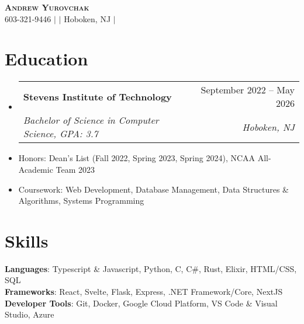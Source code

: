 \documentclass[letterpaper,11pt]{article}
\makeatletter
\newcommand{\resumeItem}[1]{
  \item\small{
    {#1 \vspace{-2pt}}
  }
}
\newcommand{\resumeSubheading}[4]{
  \vspace{-2pt}\item
    \begin{tabular*}{0.97\textwidth}[t]{l@{\extracolsep{\fill}}r}
      \textbf{#1} & #2 \\
      \textit{\small#3} & \textit{\small #4} \\
    \end{tabular*}\vspace{-7pt}
}
\newcommand{\resumeSubItem}[1]{\resumeItem{#1}\vspace{-4pt}}
\newcommand{\resumeSubHeadingListStart}{\begin{itemize}[leftmargin=0.15in, label={}]}
\newcommand{\resumeSubHeadingListEnd}{\end{itemize}}
\makeatother
\begin{document}

\begin{center}
    \textbf{\Huge \scshape Andrew Yurovchak} \\ \vspace{3pt}
    \small 603-321-9446 $|$ \href{mailto:andy@yurovchak.net}{\underline{}} $|$ \small{Hoboken, NJ} $|$
    \href{https://portfolio.baetylboy.biz}{\underline{}} \\ \vspace{-3pt}
\end{center}


\section{Education}
  \resumeSubHeadingListStart
    \resumeSubheading
      {Stevens Institute of Technology}{September 2022 -- May 2026}
      {Bachelor of Science in Computer Science, GPA: 3.7}{Hoboken, NJ}
    \resumeSubItem{Honors: Dean's List (Fall 2022, Spring 2023, Spring 2024), NCAA All-Academic Team 2023}
    \resumeSubItem{Coursework: Web Development, Database Management, Data Structures \& Algorithms, Systems Programming}
  \resumeSubHeadingListEnd


\section{Skills}
 \begin{itemize}[leftmargin=0.15in, label={}]
    \small{\item{
     \textbf{Languages}{: Typescript \& Javascript, Python, C, C\#, Rust, Elixir, HTML/CSS, SQL} \\
     \textbf{Frameworks}{: React, Svelte, Flask, Express, .NET Framework/Core, NextJS} \\
     \textbf{Developer Tools}{: Git, Docker, Google Cloud Platform, VS Code \& Visual Studio, Azure}
    }}
 \end{itemize}
\end{document}
